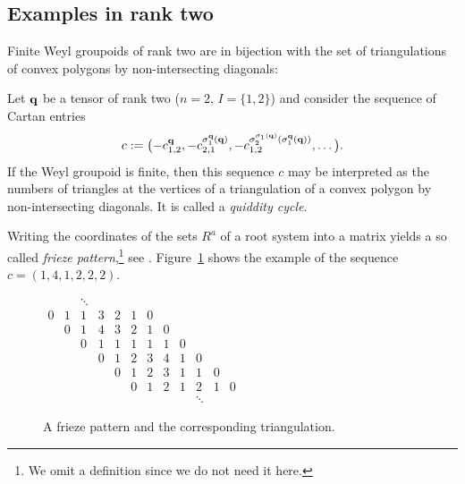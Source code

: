 \documentclass[pdftex]{sigma}
\numberwithin{equation}{section}
\newcommand{\qq }{{\bf q}}
\begin{document}
\subsection{Examples in rank two}

Finite Weyl groupoids of rank two are in bijection with
the set of triangulations of convex polygons by non-intersecting diagonals:

Let $\qq$ be a tensor of rank two ($n=2$, $I=\{1,2\}$) and consider the sequence of Cartan entries
\[c := \bigl(-c^\qq_{1,2},-c^{\sigma^\qq_1(\qq)}_{2,1},-c^{\sigma^{\sigma_1(\qq)}_2(\sigma^\qq_1(\qq))}_{1,2},\dots\bigr). \]
If the Weyl groupoid is finite, then this sequence $c$ may be interpreted as the numbers of triangles at the vertices of a triangulation of a convex polygon by non-intersecting diagonals. It is called a {\it quiddity cycle}.

Writing the coordinates of the sets $R^a$ of a root system into a matrix yields a so called {\it frieze pattern},\footnote{We omit a definition since we do not need it here.} see \cite{p-C14}. Figure~\ref{frieze} shows the example of the sequence $c=(1,4,1,2,2,2)$.
\begin{figure}[h]
 \centering
 \begin{minipage}[b]{0.44\textwidth}
 $ \begin{array}{cccccccccccc}
 & & \ddots & & & & & & & & & \\
 0 & 1 & 1 & 3 & 2 & 1 & 0 & & & & & \\
& 0 & 1 & 4 & 3 & 2 & 1 & 0 & & & & \\
 & & 0 & 1 & 1 & 1 & 1 & 1 & 0 & & & \\
 & & & 0 & 1 & 2 & 3 & 4 & 1 & 0 & & \\
 & & & & 0 & 1 & 2 & 3 & 1 & 1 & 0 & \\
 & & & & & 0 & 1 & 2 & 1 & 2 & 1 & 0 \\
 & & & & & & & & & \ddots & &
\end{array}
$
 \end{minipage}
 \qquad \qquad
 \begin{minipage}[b]{0.32\textwidth}
 \end{minipage}
\caption{A frieze pattern and the corresponding triangulation.\label{frieze}}
\end{figure}
\end{document}
